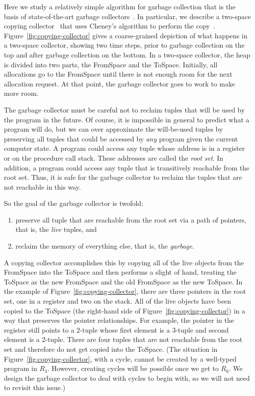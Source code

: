 \documentclass[11pt]{book}
\begin{document}
Here we study a relatively simple algorithm for garbage collection
that is the basis of state-of-the-art garbage
collectors~\citep{Lieberman:1983aa,Ungar:1984aa,Jones:1996aa,Detlefs:2004aa,Dybvig:2006aa,Tene:2011kx}. In
particular, we describe a two-space copying
collector~\citep{Wilson:1992fk} that uses Cheney's algorithm to
perform the
copy~\citep{Cheney:1970aa}. Figure~\ref{fig:copying-collector} gives a
coarse-grained depiction of what happens in a two-space collector,
showing two time steps, prior to garbage collection on the top and
after garbage collection on the bottom. In a two-space collector, the
heap is divided into two parts, the FromSpace and the
ToSpace. Initially, all allocations go to the FromSpace until there is
not enough room for the next allocation request. At that point, the
garbage collector goes to work to make more room.


The garbage collector must be careful not to reclaim tuples that will
be used by the program in the future. Of course, it is impossible in
general to predict what a program will do, but we can over approximate
the will-be-used tuples by preserving all tuples that could be
accessed by \emph{any} program given the current computer state.  A
program could access any tuple whose address is in a register or on
the procedure call stack. These addresses are called the \emph{root
  set}. In addition, a program could access any tuple that is
transitively reachable from the root set. Thus, it is safe for the
garbage collector to reclaim the tuples that are not reachable in this
way.

So the goal of the garbage collector is twofold:
\begin{enumerate}
\item preserve all tuple that are reachable from the root set via a
  path of pointers, that is, the \emph{live} tuples, and
\item reclaim the memory of everything else, that is, the
  \emph{garbage}.
\end{enumerate}
A copying collector accomplishes this by copying all of the live
objects from the FromSpace into the ToSpace and then performs a slight
of hand, treating the ToSpace as the new FromSpace and the old
FromSpace as the new ToSpace.  In the example of
Figure~\ref{fig:copying-collector}, there are three pointers in the
root set, one in a register and two on the stack.  All of the live
objects have been copied to the ToSpace (the right-hand side of
Figure~\ref{fig:copying-collector}) in a way that preserves the
pointer relationships. For example, the pointer in the register still
points to a 2-tuple whose first element is a 3-tuple and second
element is a 2-tuple.  There are four tuples that are not reachable
from the root set and therefore do not get copied into the ToSpace.
(The situation in Figure~\ref{fig:copying-collector}, with a
cycle, cannot be created by a well-typed program in $R_3$. However,
creating cycles will be possible once we get to $R_6$.  We design
the garbage collector to deal with cycles to begin with, so we will
not need to revisit this issue.)
\end{document}
